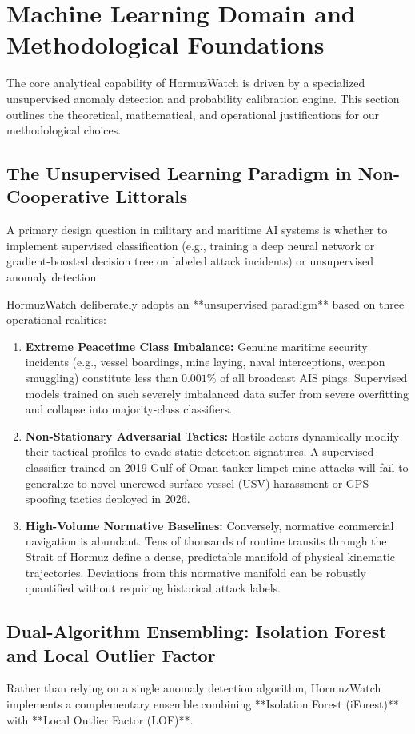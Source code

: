 \section{Machine Learning Domain and Methodological Foundations}
\label{sec:ml_methodology}

The core analytical capability of HormuzWatch is driven by a specialized unsupervised anomaly detection and probability calibration engine. This section outlines the theoretical, mathematical, and operational justifications for our methodological choices.

\subsection{The Unsupervised Learning Paradigm in Non-Cooperative Littorals}
A primary design question in military and maritime AI systems is whether to implement supervised classification (e.g., training a deep neural network or gradient-boosted decision tree on labeled attack incidents) or unsupervised anomaly detection.

HormuzWatch deliberately adopts an **unsupervised paradigm** based on three operational realities:
\begin{enumerate}[leftmargin=*]
    \item \textbf{Extreme Peacetime Class Imbalance:} Genuine maritime security incidents (e.g., vessel boardings, mine laying, naval interceptions, weapon smuggling) constitute less than $0.001\%$ of all broadcast AIS pings. Supervised models trained on such severely imbalanced data suffer from severe overfitting and collapse into majority-class classifiers.
    \item \textbf{Non-Stationary Adversarial Tactics:} Hostile actors dynamically modify their tactical profiles to evade static detection signatures. A supervised classifier trained on 2019 Gulf of Oman tanker limpet mine attacks will fail to generalize to novel uncrewed surface vessel (USV) harassment or GPS spoofing tactics deployed in 2026.
    \item \textbf{High-Volume Normative Baselines:} Conversely, normative commercial navigation is abundant. Tens of thousands of routine transits through the Strait of Hormuz define a dense, predictable manifold of physical kinematic trajectories. Deviations from this normative manifold can be robustly quantified without requiring historical attack labels.
\end{enumerate}

\subsection{Dual-Algorithm Ensembling: Isolation Forest and Local Outlier Factor}
Rather than relying on a single anomaly detection algorithm, HormuzWatch implements a complementary ensemble combining **Isolation Forest (iForest)** with **Local Outlier Factor (LOF)**.


